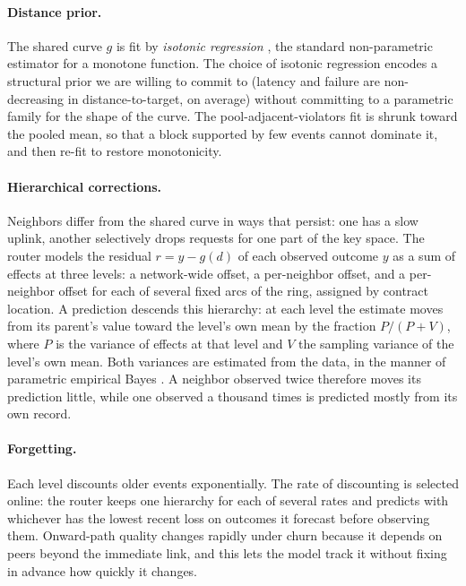 \paragraph{Distance prior.} The shared curve $g$ is fit by \emph{isotonic regression} \citep{barlow1972statistical, deleeuw2009isotone}, the standard non-parametric estimator for a monotone function. The choice of isotonic regression encodes a structural prior we are willing to commit to (latency and failure are non-decreasing in distance-to-target, on average) without committing to a parametric family for the shape of the curve. The pool-adjacent-violators fit is shrunk toward the pooled mean, so that a block supported by few events cannot dominate it, and then re-fit to restore monotonicity.



\paragraph{Hierarchical corrections.} Neighbors differ from the shared curve in ways that persist: one has a slow uplink, another selectively drops requests for one part of the key space. The router models the residual $r = y - g(d)$ of each observed outcome $y$ as a sum of effects at three levels: a network-wide offset, a per-neighbor offset, and a per-neighbor offset for each of several fixed arcs of the ring, assigned by contract location. A prediction descends this hierarchy: at each level the estimate moves from its parent's value toward the level's own mean by the fraction $P/(P+V)$, where $P$ is the variance of effects at that level and $V$ the sampling variance of the level's own mean. Both variances are estimated from the data, in the manner of parametric empirical Bayes \citep{morris1983eb}. A neighbor observed twice therefore moves its prediction little, while one observed a thousand times is predicted mostly from its own record.

\paragraph{Forgetting.} Each level discounts older events exponentially. The rate of discounting is selected online: the router keeps one hierarchy for each of several rates and predicts with whichever has the lowest recent loss on outcomes it forecast before observing them. Onward-path quality changes rapidly under churn because it depends on peers beyond the immediate link, and this lets the model track it without fixing in advance how quickly it changes.


